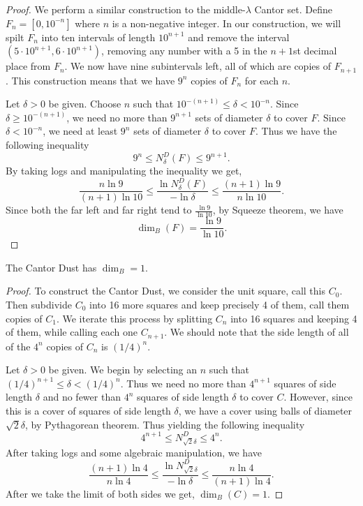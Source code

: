 \begin{proof}
	We perform a similar construction to the middle-$\lambda$ Cantor set.
	Define $F_n=[0,10^{-n}]$ where $n$ is a non-negative integer.
	In our construction, we will spilt $F_n$ into ten intervals of length $10^{n+1}$ and remove the interval $(5\cdot10^{n+1},6\cdot10^{n+1})$, removing any number with a 5 in the $n+1$st decimal place from $F_n$.
	We now have nine subintervals left, all of which are copies of $F_{n+1}$.
	This construction means that we have $9^n$ copies of $F_n$ for each $n$.
	
	Let $\delta >0$ be given.
	Choose $n$ such that $10^{-(n+1)}\leq \delta<10^{-n}$.
	Since $\delta\geq 10^{-(n+1)}$, we need no more than $9^{n+1}$ sets of diameter $\delta$ to cover $F$.
	Since $\delta<10^{-n}$, we need at least $9^n$ sets of diameter $\delta$ to cover $F$.
	Thus we have the following inequality
	\[
		9^n \leq N^D_\delta(F)\leq 9^{n+1}.
	\]
	By taking logs and manipulating the inequality we get,
	\[
		\frac{n\ln 9}{(n+1)\ln 10}\leq\frac{\ln N^D_\delta(F)}{-\ln\delta}\leq \frac{(n+1)\ln9}{n\ln 10}.
	\]
	Since both the far left and far right tend to $\frac{\ln9}{\ln10}$, by Squeeze theorem, we have
	\[
		\dim_B(F)=\frac{\ln9}{\ln10}.
	\]
\end{proof}

\begin{example}
	The Cantor Dust has $\dim_B=1$.
\end{example}

\begin{proof}
	To construct the Cantor Dust, we consider the unit square, call this $C_0$.
	Then subdivide $C_0$ into 16 more squares and keep precisely 4 of them, call them copies of $C_1$.
	We iterate this process by splitting $C_n$ into 16 squares and keeping 4 of them, while calling each one $C_{n+1}$.
	We should note that the side length of all of the $4^n$ copies of $C_n$ is $(1/4)^n$.

	Let $\delta>0$ be given.
	We begin by selecting an $n$ such that $(1/4)^{n+1}\leq \delta< (1/4)^n$.
	Thus we need no more than $4^{n+1}$ squares of side length $\delta$ and no fewer than $4^n$ squares of side length $\delta$ to cover $C$.
	However, since this is a cover of squares of side length $\delta$, we have a cover using balls of diameter $\sqrt{2}\delta$, by Pythagorean theorem.
	Thus yielding the following inequality
	\[
		4^{n+1}\leq N^D_{\sqrt{2}\delta}\leq 4^n.
	\]
	After taking logs and some algebraic manipulation, we have
	\[
		\frac{(n+1)\ln4}{n\ln4}\leq \frac{\ln N^D_{\sqrt{2}\delta}}{-\ln\delta}\leq \frac{n\ln4}{(n+1)\ln4}.
	\]
	After we take the limit of both sides we get, $\dim_B(C)=1$.
\end{proof}

